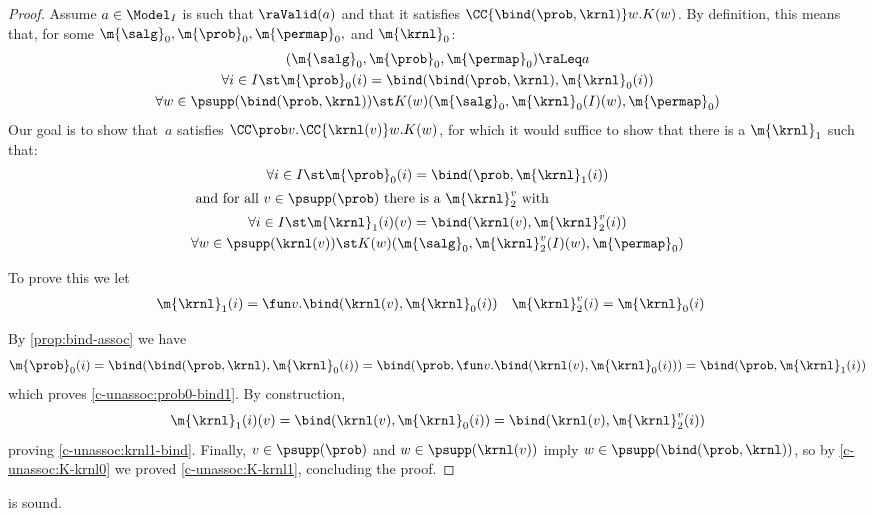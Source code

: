 \begin{proof}
  Assume $a \in \Model_I$ is such that
  $\raValid(a)$ and that it satisfies
  $ \CC{\bind(\prob,\krnl)} w.K(w) $.
  By definition, this means that,
  for some $ \m{\salg}_0, \m{\prob}_0,\m{\permap}_0,$ and $ \m{\krnl}_0 $:
  \begin{gather}
    (\m{\salg}_0, \m{\prob}_0,\m{\permap}_0) \raLeq a
    \label{c-unassoc:prob0}
    \\
    \forall i\in I\st
      \m{\prob}_0(i) = \bind(\bind(\prob, \krnl), \m{\krnl}_0(i))
    \label{c-unassoc:prob0-bind}
    \\
    \forall w \in \psupp(\bind(\prob, \krnl)) \st
      K(w)(\m{\salg}_0, \m{\krnl}_0(I)(w), \m{\permap}_0)
    \label{c-unassoc:K-krnl0}
  \end{gather}
  Our goal is to show that~$a$ satisfies
  $\CC\prob v. \CC{\krnl(v)} w.K(w)$,
  for which it would suffice to show that there is a $\m{\krnl}_1$
  such that:
  \begin{gather}
    \forall i\in I\st
      \m{\prob}_0(i) = \bind(\prob, \m{\krnl}_1(i))
    \label{c-unassoc:prob0-bind1}
    \\
    \intertext{
      and for all $v \in \psupp(\prob)$
      there is a $\m{\krnl}_2^v$ with
    }
    \forall i\in I\st
      \m{\krnl}_1(i)(v) = \bind(\krnl(v), \m{\krnl}_2^v(i))
    \label{c-unassoc:krnl1-bind}
    \\
    \forall w \in \psupp(\krnl(v)) \st
      K(w)(\m{\salg}_0, \m{\krnl}_2^v(I)(w), \m{\permap}_0)
    \label{c-unassoc:K-krnl1}
  \end{gather}

  To prove this we let
  \begin{align*}
    \m{\krnl}_1(i) &= \fun v.\bind(\krnl(v), \m{\krnl}_0(i))
    &
    \m{\krnl}_2^v(i) &= \m{\krnl}_0(i)
  \end{align*}

  By \eqref{prop:bind-assoc} we have
  \[
    \m{\prob}_0(i)
    = \bind(\bind(\prob, \krnl), \m{\krnl}_0(i))
    = \bind(\prob, \fun v.\bind(\krnl(v), \m{\krnl}_0(i)))
    = \bind(\prob, \m{\krnl}_1(i))
  \]
  which proves \eqref{c-unassoc:prob0-bind1}.
  By construction,
  \[
    \m{\krnl}_1(i)(v)
    = \bind(\krnl(v), \m{\krnl}_0(i))
    = \bind(\krnl(v), \m{\krnl}_2^v(i))
  \]
  proving \eqref{c-unassoc:krnl1-bind}.
  Finally,
  $v \in \psupp(\prob)$ and $w \in \psupp(\krnl(v))$
  imply $w \in \psupp(\bind(\prob, \krnl))$,
  so by \eqref{c-unassoc:K-krnl0} we proved
  \eqref{c-unassoc:K-krnl1}, concluding the proof.
\end{proof}
 \begin{lemma}
\label{proof:c-and}
   is sound.
\end{lemma}

